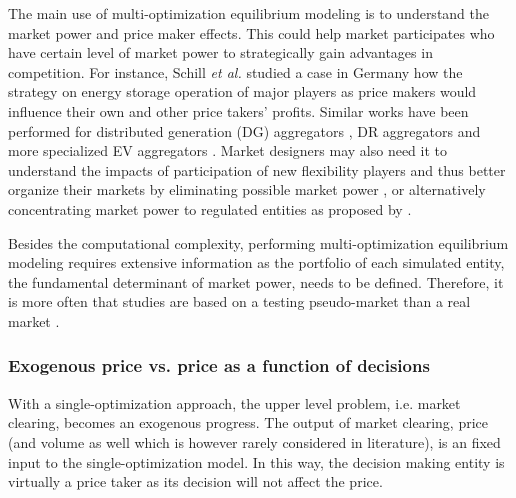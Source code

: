 The main use of multi-optimization equilibrium modeling is to understand the market power and price maker effects. This could help market participates who have certain level of market power to strategically gain advantages in competition. For instance, Schill \textit{et al.} \cite{Schill2011} studied a case in Germany how the strategy on energy storage operation of major players as price makers would influence their own and other price takers' profits. Similar works have been performed for distributed generation (DG) aggregators \cite{Zhang2016}, DR aggregators \cite{HenriquezAuba2017} and more specialized EV aggregators \cite{Shafie-Khah2015}. Market designers may also need it to understand the impacts of participation of new flexibility players and thus better organize their markets by eliminating possible market power \cite{Mohsenian-Rad2016,Vespermann2017,Huang2017}, or alternatively concentrating market power to regulated entities as proposed by \cite{He2012}.

Besides the computational complexity, performing multi-optimization equilibrium modeling requires extensive information as the portfolio of each simulated entity, the fundamental determinant of market power, needs to be defined. Therefore, it is more often that studies are based on a testing pseudo-market  \cite{Kardakos2013,Shafie-Khah2015,HenriquezAuba2017} than a real market \cite{Schill2011}.



\subsubsection{Exogenous price vs. price as a function of decisions}

With a single-optimization approach, the upper level problem, i.e. market clearing, becomes an exogenous progress. The output of market clearing, price (and volume as well which is however rarely considered in literature), is an fixed input to the single-optimization model. In this way, the decision making entity is virtually a price taker as its decision will not affect the price. 

